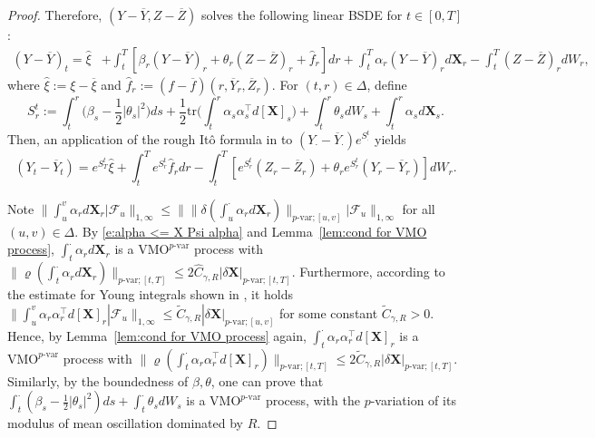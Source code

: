 \documentclass[11pt,reqno]{amsart}
\numberwithin{equation}{section}
\begin{document}
\begin{proof}
Therefore, $(Y-\overline Y,Z-\overline Z)$ solves the following linear BSDE for $t\in[0,T]$: 
\begin{equation*}
\begin{aligned}
(Y-\overline Y)_{t} = \hat \xi &+ \int_{t}^{T} [\beta_{r}(Y - \overline Y)_r + \theta_{r}(Z - \overline Z)_r + \hat f_r] dr + \int_{t}^{T} \alpha_{r} (Y - \overline Y)_{r} d\mathbf X_{r} - \int_{t}^{T} (Z - \overline Z)_{r} dW_{r}, 
\end{aligned}
\end{equation*}
where $\hat \xi := \xi - \overline \xi$ and $\hat f_r := (f - \overline f)(r,\overline Y_r,\overline Z_r)$. For $(t,r) \in \Delta$, define 
\begin{equation*}
S^{t}_{r} := \int_{t}^{r} 
\Big(\beta_s - \frac{1}{2} |\theta_s|^2 \Big) ds + 
\frac{1}{2} \mathrm{tr}\Big( \int_{t}^{r} \alpha_s \alpha^{\top}_s d[\mathbf X]_s \Big)
+ \int_{t}^{r} \theta_{s} dW_{s} + \int_{t}^{r} \alpha_{s} d\mathbf X_s .
\end{equation*}
Then, an application of the rough It\^o formula in \cite[Theorem~4.19]{dause2026controlled} to $(Y_{\bm\cdot} - \overline Y_{\bm\cdot}) e^{S^{t}_{\bm\cdot}}$ yields
\begin{equation}\label{e:Ito to Y - Y}
(Y_t - \overline Y_t) = e^{S^{t}_{T}} \hat \xi + \int_{t}^{T} e^{S^t_r} \hat f_r dr - \int_{t}^{T} [ e^{S^t_r} (Z_r - \overline Z_r)  + \theta_{r} e^{S^{t}_r} (Y_r - \overline Y_r)] dW_{r}.
\end{equation}

Note $\| \int_{u}^{v}\alpha_{r} d\mathbf X_{r} | \mathcal F_{u}\|_{1,\infty} \le \|\|\delta ( \int_{u}^{\bm\cdot}\alpha_{r}d\mathbf X_r)\|_{p\text{-}\mathrm{var};[u,v]}\big| \mathcal F_u \|_{1,\infty}$ for all $(u,v) \in \Delta$. By \eqref{e:alpha <= X Psi alpha} and Lemma~\ref{lem:cond for VMO process}, $\int_{t}^{\bm\cdot}\alpha_{r}d\mathbf X_r$ is a $\mathrm{VMO}^{p\text{-}\mathrm{var}}$ process with $\| \varrho(\int_{t}^{\bm\cdot}\alpha_{r}d\mathbf X_r)\|_{p\text{-}\mathrm{var};[t,T]} \le 2\hat C_{\gamma,R} |\delta \mathbf X|_{p\text{-}\mathrm{var};[t,T]}$. 
Furthermore, according to the estimate for Young integrals shown in \cite[Theorem~6.8]{friz2010multidimensional}, it holds $\|\int_{u}^{v}\alpha_r \alpha^{\top}_r d[\mathbf X]_r | \mathcal F_{u}\|_{1,\infty} \le \tilde{C}_{\gamma,R} |\delta \mathbf X|_{p\text{-}\mathrm{var};[u,v]}$ for some constant $\tilde{C}_{\gamma,R} > 0$. Hence, by Lemma~\ref{lem:cond for VMO process} again, $\int_{t}^{\bm\cdot}\alpha_r \alpha^{\top}_r d[\mathbf X]_r$ is a $\mathrm{VMO}^{p\text{-}\mathrm{var}}$ process with $\| \varrho(\int_{t}^{\bm\cdot}\alpha_r \alpha^{\top}_r d[\mathbf X]_r)\|_{p\text{-}\mathrm{var};[t,T]} \le 2\tilde{C}_{\gamma,R} |\delta \mathbf X|_{p\text{-}\mathrm{var};[t,T]}$. 
Similarly, by the boundedness of $\beta,\theta$, one can prove that $\int_{t}^{\bm\cdot} (\beta_s - \frac{1}{2}|\theta_s|^2) ds + \int_{t}^{\bm\cdot} \theta_s dW_s$ is  a $\mathrm{VMO}^{p\text{-}\mathrm{var}}$ process, with the $p$-variation of its modulus of mean oscillation dominated by $R$. 


\end{proof}
\end{document}

